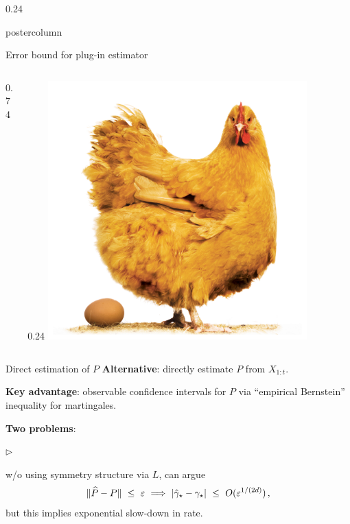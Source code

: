 \documentclass[notheorems,final]{beamer}
\newcommand{\compresslist}{%
  \setlength{\itemsep}{1pt}%
  \setlength{\parskip}{0pt}%
  \setlength{\parsep}{0pt}%
  \setlength{\leftmargin}{0.7cm}%
}
\newcommand{\AWESOME}[1]{\textcolor{awesome}{#1}}
\newcommand\gap{\ensuremath{\gamma_{\star}}}
\newcommand\hatgap{\ensuremath{\hat{\gamma}_{\star}}}
\begin{document}
\begin{frame}{}
\begin{columns}
\begin{column}{0.24\textwidth}
\begin{beamercolorbox}[center,wd=\textwidth]{postercolumn}
\begin{minipage}[T]{.95\textwidth}
{\begin{block}{Error bound for plug-in estimator}
\begin{columns}
\begin{column}{0.74\textwidth}
\begin{center}
                    \end{center}
                  \end{column}
                  \begin{column}{0.24\textwidth}
                    \includegraphics[width=0.80\textwidth]{chicken-and-egg.jpg}
                  \end{column}
                \end{columns}
              \end{block}

              \begin{block}{Direct estimation of $P$}
                \textbf{Alternative}: directly estimate $P$ from $X_{1:t}$.

                \smallskip
                \textbf{Key advantage}: observable confidence
                intervals for $P$ via ``empirical Bernstein''
                inequality for martingales.

                \smallskip
                \textbf{Two problems}:
                \begin{list}{$\triangleright$}\compresslist
                  \item
                    w/o using symmetry structure via $L$, can argue
                    \[
                      \norm{\wh{P} - P} \ \leq \ \veps
                      \ \Longrightarrow \
                      \abs{\hatgap - \gap} \ \leq \ O(\veps^{1/(2d)})
                      \,,
                    \]
                    but this implies \AWESOME{exponential slow-down in rate}.


\end{list}
\end{block}}
\end{minipage}
\end{beamercolorbox}
\end{column}
\end{columns}
\end{frame}
\end{document}
